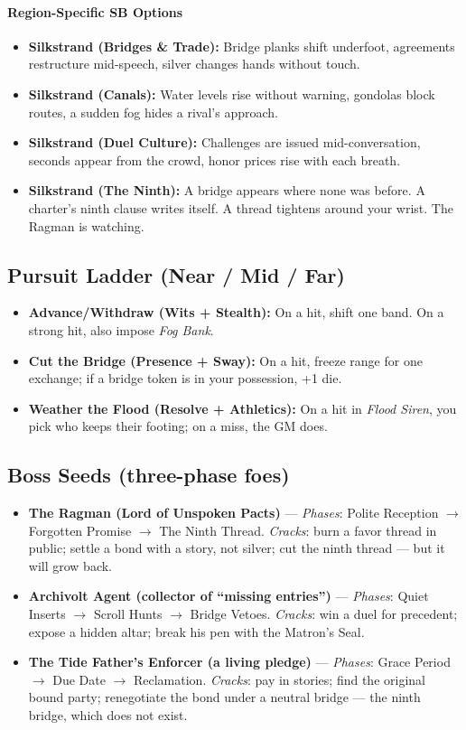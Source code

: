 \paragraph{Region-Specific SB Options}
\begin{itemize}
\item \textbf{Silkstrand (Bridges \& Trade):} Bridge planks shift underfoot, agreements restructure mid-speech, silver changes hands without touch.
\item \textbf{Silkstrand (Canals):} Water levels rise without warning, gondolas block routes, a sudden fog hides a rival's approach.
\item \textbf{Silkstrand (Duel Culture):} Challenges are issued mid-conversation, seconds appear from the crowd, honor prices rise with each breath.
\item \textbf{Silkstrand (The Ninth):} A bridge appears where none was before. A charter's ninth clause writes itself. A thread tightens around your wrist. The Ragman is watching.
\end{itemize}

\subsection*{Pursuit Ladder (Near / Mid / Far)}
\begin{itemize}
\item \textbf{Advance/Withdraw (Wits + Stealth):} On a hit, shift one band. On a strong hit, also impose \emph{Fog Bank}.
\item \textbf{Cut the Bridge (Presence + Sway):} On a hit, freeze range for one exchange; if a bridge token is in your possession, +1 die.
\item \textbf{Weather the Flood (Resolve + Athletics):} On a hit in \emph{Flood Siren}, you pick who keeps their footing; on a miss, the GM does.
\end{itemize}

\subsection*{Boss Seeds (three-phase foes)}
\begin{itemize}
\item \textbf{The Ragman (Lord of Unspoken Pacts)} --- \emph{Phases}: Polite Reception $\rightarrow$ Forgotten Promise $\rightarrow$ The Ninth Thread. \emph{Cracks}: burn a favor thread in public; settle a bond with a story, not silver; cut the ninth thread --- but it will grow back.
\item \textbf{Archivolt Agent (collector of ``missing entries'')} --- \emph{Phases}: Quiet Inserts $\rightarrow$ Scroll Hunts $\rightarrow$ Bridge Vetoes. \emph{Cracks}: win a duel for precedent; expose a hidden altar; break his pen with the Matron's Seal.
\item \textbf{The Tide Father's Enforcer (a living pledge)} --- \emph{Phases}: Grace Period $\rightarrow$ Due Date $\rightarrow$ Reclamation. \emph{Cracks}: pay in stories; find the original bound party; renegotiate the bond under a neutral bridge --- the ninth bridge, which does not exist.
\end{itemize}

